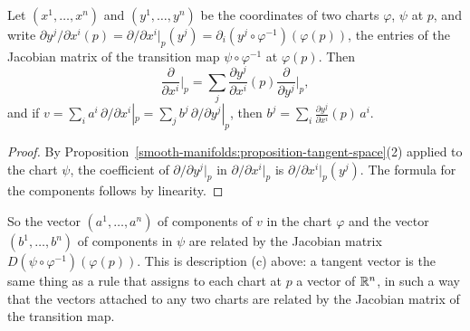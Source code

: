 \begin{proposition}\label{smooth-manifolds:proposition-change-of-coordinates}
Let $(x^1, \ldots, x^n)$ and $(y^1, \ldots, y^n)$ be the coordinates of two charts $\varphi$, $\psi$ at $p$, and write
$\partial y^j/\partial x^i(p) = \partial/\partial x^i|_p(y^j) = \partial_i(y^j \circ \varphi^{-1})(\varphi(p))$, the entries of the Jacobian matrix of the
transition map $\psi \circ \varphi^{-1}$ at $\varphi(p)$. Then
\[
\frac{\partial}{\partial x^i}\Big|_p = \sum_j\frac{\partial y^j}{\partial x^i}(p)\frac{\partial}{\partial y^j}\Big|_p,
\]
and if $v = \sum_ia^i\,\partial/\partial x^i|_p = \sum_jb^j\,\partial/\partial y^j|_p$, then $b^j = \sum_i\frac{\partial y^j}{\partial x^i}(p)\,a^i$.
\end{proposition}

\begin{proof}
By Proposition~\ref{smooth-manifolds:proposition-tangent-space}(2) applied to the chart $\psi$, the coefficient of $\partial/\partial y^j|_p$ in
$\partial/\partial x^i|_p$ is $\partial/\partial x^i|_p(y^j)$. The formula for the components follows by linearity.
\end{proof}

So the vector $(a^1, \ldots, a^n)$ of components of $v$ in the chart $\varphi$ and the vector $(b^1, \ldots, b^n)$ of components in $\psi$ are related by the
Jacobian matrix $D(\psi \circ \varphi^{-1})(\varphi(p))$. This is description (c) above: a tangent vector is the same thing as a rule that assigns to each chart
at $p$ a vector of $\mathbb{R}^n$, in such a way that the vectors attached to any two charts are related by the Jacobian matrix of the transition map.

